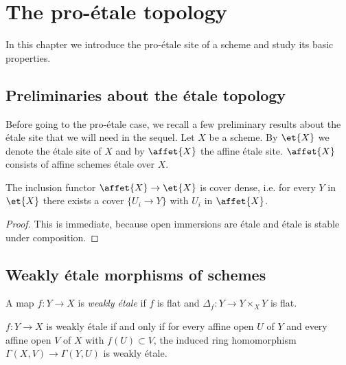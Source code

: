 \chapter{The pro-étale topology}

In this chapter we introduce the pro-étale site of a scheme and study its basic properties.

\section{Preliminaries about the étale topology}

Before going to the pro-étale case, we recall a few preliminary results about the étale site that
we will need in the sequel. Let $X$ be a scheme. By $\et{X}$ we denote the étale site of $X$ and by
$\affet{X}$ the affine étale site. $\affet{X}$ consists of affine schemes étale over $X$.

\begin{lemma}
    The inclusion functor $\affet{X} \to \et{X}$ is cover dense, i.e. for every $Y$ in $\et{X}$
    there exists a cover $\{U_i \to Y\} $ with $U_i$ in $\affet{X}$.
    \label{lemma:affet-gen-et}
\end{lemma}

\begin{proof}
    This is immediate, because open immersions are étale and étale is stable under composition.
\end{proof}

\section{Weakly étale morphisms of schemes}

\begin{definition}
    A map $f \colon Y \to X$ is \emph{weakly étale} if $f$ is flat and
    $\Delta_f\colon Y \to Y \times_{X} Y$ is flat.

    \label{def:weakly-etale-morphism}
\end{definition}

\begin{lemma}
    $f \colon Y \to X$ is weakly étale if and only if
    for every affine open $U$ of $Y$ and every affine open $V$ of $X$ with $f(U) \subset V$,
    the induced ring homomorphism $\Gamma(X, V) \to \Gamma(Y, U)$ is weakly étale.
    \leanok
    \label{lemma:weakly-etale-hasringhomprop}
\end{lemma}

